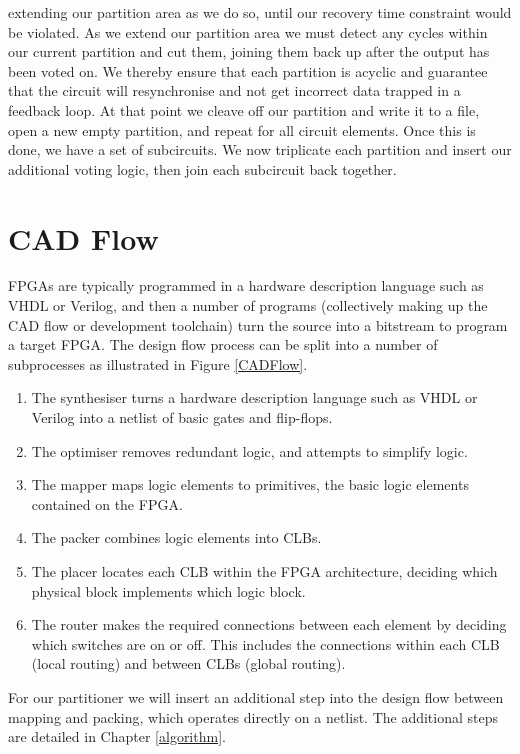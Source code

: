\documentclass[12pt,final,oneside]{dwThesis} %
\begin{document}
   extending our partition area as we do so, until our recovery time
   constraint would be violated.  As we extend our partition area we must
   detect any cycles within our current partition and cut them, joining them back up after the output has
   been voted on. We thereby ensure that each partition is acyclic and
   guarantee that the circuit will resynchronise and not get incorrect data
   trapped in a feedback loop.  At that point we cleave off our partition and
   write it to a file, open a new empty partition, and repeat for all circuit
   elements.  Once this is done, we have a set of subcircuits. We now
   triplicate each partition and insert our additional voting logic, then join
   each subcircuit back together.

   \section{\gls{CAD}
      Flow} \glspl{FPGA} are typically programmed
   in a hardware description language such as \gls{VHDL} or Verilog, and then a
   number of programs (collectively making up the \gls{CAD} flow or development
   toolchain) turn the source into a bitstream to program a target \gls{FPGA}.
   The design flow process can be split into a number of
   subprocesses as illustrated in Figure
   \ref{CADFlow}\cite{VPRBook,VPRManual,FPGAArch}.  
   \begin{enumerate}

      \item The synthesiser turns a hardware description language such as VHDL
         or Verilog into a netlist of basic gates and flip-flops.
      \item The optimiser removes redundant logic, and attempts to simplify
         logic.
      \item The mapper maps logic elements to \glspl{primitive}, the basic
         logic elements contained on the \gls{FPGA}.
      \item The packer combines logic elements into \glspl{CLB}.
      \item The placer locates each \gls{CLB} within the \gls{FPGA}
         architecture, deciding which physical block implements which logic
         block.
      \item The router makes the required connections between each element by
         deciding which switches are on or off. This includes the
         connections within each \gls{CLB} (local routing) and between
         \glspl{CLB} (global routing).  
   \end{enumerate}
   For our partitioner
   we will insert an additional step into the design flow between mapping
   and packing, which operates directly on a netlist. The additional steps
   are detailed in Chapter \ref{algorithm}.
\end{document}
